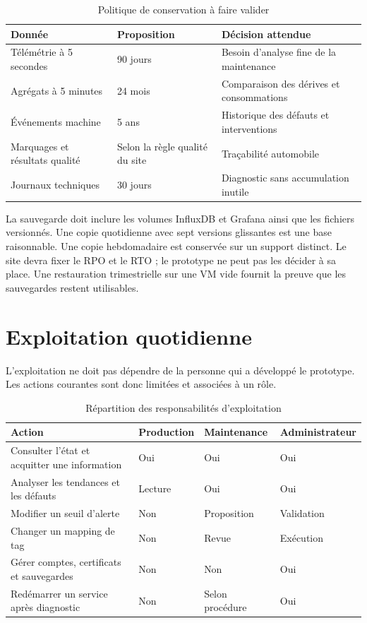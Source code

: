 \begin{table}[H]
\centering
\caption{Politique de conservation à faire valider}
\begin{tabularx}{\textwidth}{p{}p{}Y}
\toprule
Donnée & Proposition & Décision attendue \\
\midrule
Télémétrie à 5 secondes & 90 jours & Besoin d'analyse fine de la maintenance \\
Agrégats à 5 minutes & 24 mois & Comparaison des dérives et consommations \\
Événements machine & 5 ans & Historique des défauts et interventions \\
Marquages et résultats qualité & Selon la règle qualité du site & Traçabilité automobile \\
Journaux techniques & 30 jours & Diagnostic sans accumulation inutile \\
\bottomrule
\end{tabularx}
\end{table}

La sauvegarde doit inclure les volumes InfluxDB et Grafana ainsi que les
fichiers versionnés. Une copie quotidienne avec sept versions glissantes est
une base raisonnable. Une copie hebdomadaire est conservée sur un support
distinct. Le site devra fixer le RPO et le RTO ; le prototype ne peut pas les
décider à sa place. Une restauration trimestrielle sur une VM vide fournit la
preuve que les sauvegardes restent utilisables.

\section{Exploitation quotidienne}

L'exploitation ne doit pas dépendre de la personne qui a développé le
prototype. Les actions courantes sont donc limitées et associées à un rôle.

\begin{table}[H]
\centering
\caption{Répartition des responsabilités d'exploitation}
\begin{tabularx}{\textwidth}{p{}YYY}
\toprule
Action & Production & Maintenance & Administrateur \\
\midrule
Consulter l'état et acquitter une information & Oui & Oui & Oui \\
Analyser les tendances et les défauts & Lecture & Oui & Oui \\
Modifier un seuil d'alerte & Non & Proposition & Validation \\
Changer un mapping de tag & Non & Revue & Exécution \\
Gérer comptes, certificats et sauvegardes & Non & Non & Oui \\
Redémarrer un service après diagnostic & Non & Selon procédure & Oui \\
\bottomrule
\end{tabularx}
\end{table}

